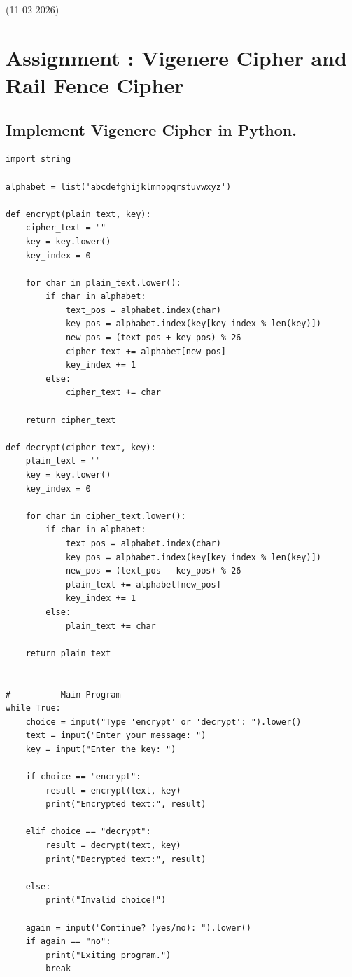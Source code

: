 
{(11-02-2026)}{\thepage}
\section*{\centering Assignment \thesection: Vigenere Cipher and Rail Fence Cipher}

\subsection{Implement Vigenere Cipher in Python.}
\begin{lstlisting}[style=pythonStyle, caption={}]
import string

alphabet = list('abcdefghijklmnopqrstuvwxyz')

def encrypt(plain_text, key):
    cipher_text = ""
    key = key.lower()
    key_index = 0

    for char in plain_text.lower():
        if char in alphabet:
            text_pos = alphabet.index(char)
            key_pos = alphabet.index(key[key_index % len(key)])
            new_pos = (text_pos + key_pos) % 26
            cipher_text += alphabet[new_pos]
            key_index += 1
        else:
            cipher_text += char

    return cipher_text

def decrypt(cipher_text, key):
    plain_text = ""
    key = key.lower()
    key_index = 0

    for char in cipher_text.lower():
        if char in alphabet:
            text_pos = alphabet.index(char)
            key_pos = alphabet.index(key[key_index % len(key)])
            new_pos = (text_pos - key_pos) % 26
            plain_text += alphabet[new_pos]
            key_index += 1
        else:
            plain_text += char

    return plain_text


# -------- Main Program --------
while True:
    choice = input("Type 'encrypt' or 'decrypt': ").lower()
    text = input("Enter your message: ")
    key = input("Enter the key: ")

    if choice == "encrypt":
        result = encrypt(text, key)
        print("Encrypted text:", result)

    elif choice == "decrypt":
        result = decrypt(text, key)
        print("Decrypted text:", result)

    else:
        print("Invalid choice!")

    again = input("Continue? (yes/no): ").lower()
    if again == "no":
        print("Exiting program.")
        break
\end{lstlisting}
